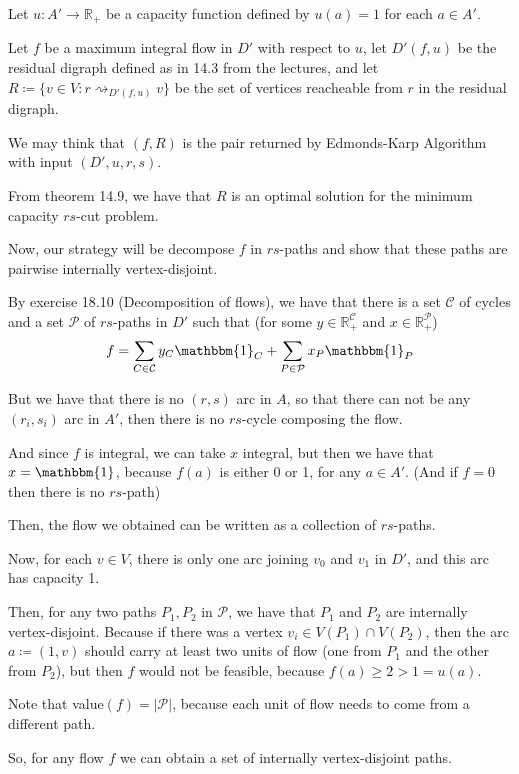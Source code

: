 \documentclass[a4paper,10pt, leqno]{article}
\theoremstyle{definition}
\begin{document}
Let $u : A' \to \mathbb{R}_+$ be a capacity function defined by $u(a) = 1$ for each $a \in A'$.

Let $f$ be a maximum integral flow in $D'$ with respect to $u$, let $D'(f, u)$ be the residual digraph defined as in 14.3 from the lectures, and let $R \coloneqq \{v \in V : r \rightsquigarrow_{D'(f, u)} v \}$ be the set of vertices reacheable from $r$ in the residual digraph.

We may think that $(f, R)$ is the pair returned by Edmonds-Karp Algorithm with input $(D', u, r, s)$.

From theorem 14.9, we have that $R$ is an optimal solution for the minimum capacity $rs$-cut problem.

Now, our strategy will be decompose $f$ in $rs$-paths and show that these paths are pairwise internally vertex-disjoint. 

By exercise 18.10 (Decomposition of flows), we have that there is a set  $\mathcal{C}$ of cycles and a set $\mathcal{P}$ of $rs$-paths in $D'$  such that (for some $y \in \mathbb{R}_+^{\mathcal{C}}$ and $x \in \mathbb{R}_+^{\mathcal{P}}$)
$$f = \sum_{C \in \mathcal{C}}{y_C\mathbbm{1}_C} + \sum_{P \in \mathcal{P}}{x_P\mathbbm{1}_P}$$

But we have that there is no $(r, s)$ arc in $A$, so that there can not be any $(r_i, s_i)$ arc in $A'$, then there is no $rs$-cycle composing the flow.

And since $f$ is integral, we can take $x$ integral, but then we have that $x = \mathbbm{1}$, because $f(a)$ is either 0 or 1, for any $a \in A'$. (And if $f = 0$ then there is no $rs$-path) 

Then, the flow we obtained can be written as a collection of $rs$-paths. 

Now, for each $v \in V$, there is only one arc joining $v_0$ and $v_1$ in $D'$, and this arc has capacity 1.

Then, for any two paths $P_1, P_2$ in $\mathcal{P}$, we have that $P_1$ and $P_2$ are internally vertex-disjoint. Because if there was a vertex $v_i \in V(P_1) \cap V(P_2)$, then the arc $a \coloneqq (1, v)$ should carry at least two units of flow (one from $P_1$ and the other from $P_2$), but then $f$ would not be feasible, because $f(a) \geq 2 > 1 = u(a)$. 

Note that value$(f) = |\mathcal{P}|$, because each unit of flow needs to come from a different path.

So, for any flow $f$ we can obtain a set of internally vertex-disjoint paths.
\end{document}
